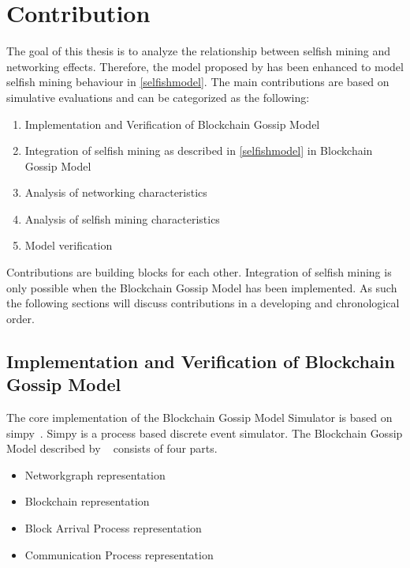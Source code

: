 
\chapter{Contribution}\label{chap:contribution}
The goal of this thesis is to analyze the relationship between selfish mining and networking effects. Therefore, the model proposed by \gopalan has been enhanced to model selfish mining behaviour in \ref{selfishmodel}. The main contributions are based on simulative evaluations and can be categorized as the following:
\begin{enumerate}
	\item Implementation and Verification of Blockchain Gossip Model~\cite{gopalan}
	\item Integration of selfish mining as described in \ref{selfishmodel} in Blockchain Gossip Model 
	\item Analysis of networking characteristics
	\item Analysis of selfish mining characteristics
	\item Model verification
\end{enumerate}
Contributions are building blocks for each other. Integration of selfish mining is only possible when the Blockchain Gossip Model has been implemented.
As such the following sections will discuss contributions in a developing and chronological order.

\section{Implementation and Verification of Blockchain Gossip Model}

The core implementation of the Blockchain Gossip Model Simulator is based on simpy~\cite{simpy}. Simpy is a process based discrete event simulator. The Blockchain Gossip Model described by \citeauthor{gopalan}~\cite{gopalan} consists of four parts. 
\begin{itemize}
\item Networkgraph representation
\item Blockchain representation
\item Block Arrival Process representation
\item Communication Process representation
\end{itemize}
